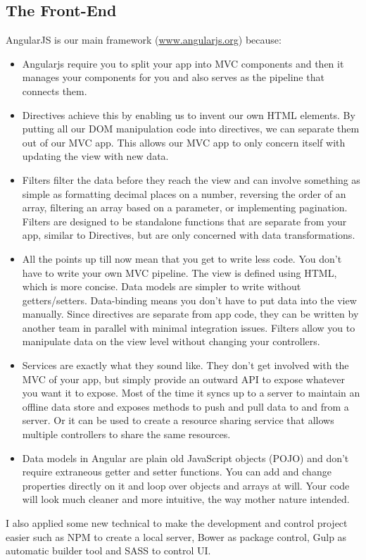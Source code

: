 \documentclass[a4paper,12pt]{article}
\begin{document}
\subsection{The Front-End}
AngularJS is our main framework (\url{www.angularjs.org}) because:
\begin{itemize}
	\item Angularjs require you to split your app into MVC components and then it manages your components for you and also serves as the pipeline that connects them.
	\item Directives achieve this by enabling us to invent our own HTML elements. By putting all our DOM manipulation code into directives, we can separate them out of our MVC app. This allows our MVC app to only concern itself with updating the view with new data.
	\item Filters filter the data before they reach the view and can involve something as simple as formatting decimal places on a number, reversing the order of an array, filtering an array based on a parameter, or implementing pagination. Filters are designed to be standalone functions that are separate from your app, similar to Directives, but are only concerned with data transformations.
	\item All the points up till now mean that you get to write less code. You don’t have to write your own MVC pipeline. The view is defined using HTML, which is more concise. Data models are simpler to write without getters/setters. Data-binding means you don’t have to put data into the view manually. Since directives are separate from app code, they can be written by another team in parallel with minimal integration issues. Filters allow you to manipulate data on the view level without changing your controllers.
	\item Services are exactly what they sound like. They don’t get involved with the MVC of your app, but simply provide an outward API to expose whatever you want it to expose. Most of the time it syncs up to a server to maintain an offline data store and exposes methods to push and pull data to and from a server. Or it can be used to create a resource sharing service that allows multiple controllers to share the same resources.
	\item Data models in Angular are plain old JavaScript objects (POJO) and don’t require extraneous getter and setter functions. You can add and change properties directly on it and loop over objects and arrays at will. Your code will look much cleaner and more intuitive, the way mother nature intended.
\end{itemize}
I also applied some new technical to make the development and
control project easier such as NPM to create a local server, Bower as package control, Gulp as automatic builder tool and SASS to control UI.
\end{document}
